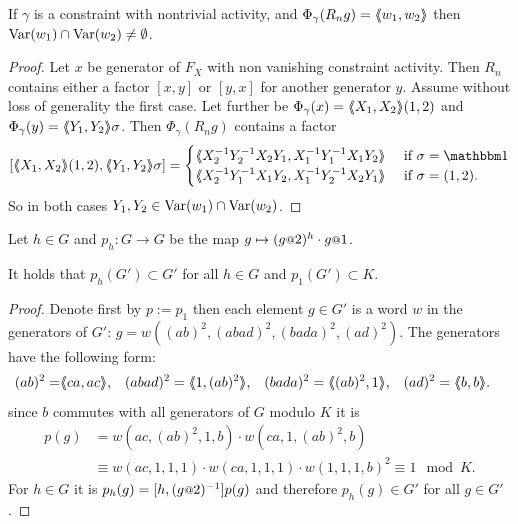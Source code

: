 \documentclass[a4paper,11pt]{amsart}
\begin{document}
\begin{lem} \label{lem:commonVar}
 If $\gamma$ is a constraint with nontrivial activity, and $\Phi_\gamma(R_ng)=\langle\negthickspace\langle w_1,w_2\rangle\negthickspace\rangle$ then $\textup{Var}(w_1)\cap\textup{Var}(w_2)\neq \emptyset$.
\end{lem}
\begin{proof}
 Let $x$ be generator of $F_X$ with non vanishing constraint activity. 
 Then $R_n$ contains either a factor $[x,y]$ or $[y,x]$ for another generator $y$. Assume without loss of generality the first case.
 Let further be $\Phi_\gamma(x)=\langle\negthickspace\langle X_1,X_2\rangle\negthickspace\rangle(1,2)$ and $\Phi_\gamma(y)=\langle\negthickspace\langle Y_1,Y_2\rangle\negthickspace\rangle\sigma$. 
 Then $\Phi_\gamma(R_n g)$ contains a factor 
 \[ [\pair{X_1,X_2}(1,2),\pair{Y_1,Y_2}\sigma] = \begin{cases}
                                                   \pair{X_2^{-1}Y_2^{-1}X_2Y_1,X_1^{-1}Y_1^{-1}X_1Y_2} & \textup{ if } \sigma=\id \\
                                                   \pair{X_2^{-1}Y_1^{-1}X_1Y_2,X_1^{-1}Y_2^{-1}X_2Y_1} & \textup{ if } \sigma=(1,2) . \\
                                                 \end{cases}
\] So in both cases $Y_1,Y_2\in \textup{Var}(w_1)\cap \textup{Var}(w_2)$. 
\end{proof}
\begin{lem} \label{lem:productOfStatesIsInDerived} 
 Let $h\in G$ and $p_h\colon G\to G$ be the map $g\mapsto (g\at{2})^{h}\cdot g\at{1}$.
 
 It holds that $p_h(G')\subset G'$ for all $h\in G$ and $p_1(G')\subset K$. 
\end{lem}
\begin{proof}
 Denote first by $p:=p_1$ then  each element $g\in G'$ is a word $w$ in the generators of $G'$:
 $g=w((ab)^2,(abad)^2,(bada)^2,(ad)^2)$. 
 The generators have the following form:
 \begin{align*}
 (ab)^2=&\pair{ca,ac},& (abad)^2 &= \pair{1,(ab)^2},& (bada)^2&=\pair{(ab)^2,1},& (ad)^2&=\pair{b,b}.
 \end{align*}
 since $b$ commutes with all generators of $G$ modulo $K$ it is
 \begin{align*}
  p(g) &= w(ac,(ab)^2,1,b) \cdot w(ca,1,(ab)^2,b)\\ &\equiv w(ac,1,1,1) \cdot w(ca,1,1,1) \cdot w(1,1,1,b)^2 \equiv 1 \mod K.
 \end{align*}
 For $h\in G$ it is $p_h(g)=[h,(g\at{2})^{-1}]p(g)$ and therefore $p_h(g)\in G'$ for all $g\in G'$.
\end{proof}
\end{document}
